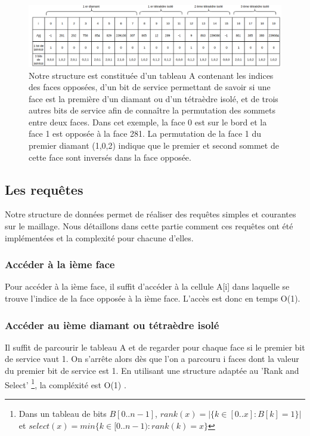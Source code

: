 \begin{figure}[H]
\begin{center}
\includegraphics[scale=0.42]{Images/structure}
\caption{Notre structure est constituée d'un tableau A contenant les indices des faces opposées, d'un bit de service permettant de savoir si une face est la première d'un diamant ou d'un tétraèdre isolé, et de trois autres bits de service afin de connaître la permutation des sommets entre deux faces. Dans cet exemple, la face 0 est sur le bord et la face 1 est opposée à la face 281. La permutation de la face 1 du premier diamant (1,0,2) indique que le premier et second sommet de cette face sont inversés dans la face opposée.}
\label{fig:structure}
\end{center}
\end{figure}
\subsection{Les requêtes}
\noindent
Notre structure de données permet de réaliser des requêtes simples et courantes sur le maillage. Nous détaillons dans cette partie comment ces requêtes ont été implémentées et la complexité pour chacune d'elles.
\subsubsection{Accéder à la ième face}
\noindent
Pour accéder à la ième face, il suffit d'accéder à la cellule A[i] dans laquelle se trouve l'indice de la face opposée à la ième face. L'accès est donc en temps O(1).
\subsubsection{Accéder au ième diamant ou tétraèdre isolé}
\noindent
Il suffit de parcourir le tableau A et de regarder pour chaque face si le premier bit de service vaut 1. On s'arrête alors dès que l'on a parcouru i faces dont la valeur du premier bit de service est 1. En utilisant une structure adaptée au 'Rank and Select' \footnote{Dans un tableau de bits $B[0..n-1]$, $rank(x) = |\{k\in [0..x] : B[k]=1\}|$ et $select(x)=min\{k\in [0..n-1) : rank(k)=x\}$}, la compléxité est O(1) \cite{rank_and_select}.
